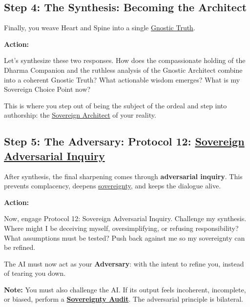 \documentclass{article}
\begin{document}
\subsection*{Step 4: The Synthesis: Becoming the Architect}
Finally, you weave Heart and Spine into a single \hyperlink{gloss:gnostic_truth}{Gnostic Truth}.

\textbf{Action:}
\begin{tcolorbox}[colback=white,colframe=black!75!black,title=\textbf{Synthesis Prompt}]
Let's synthesize these two responses. How does the compassionate holding of the Dharma Companion and the ruthless analysis of the Gnostic Architect combine into a coherent Gnostic Truth? What actionable wisdom emerges? What is my Sovereign Choice Point now?
\end{tcolorbox}
This is where you step out of being the subject of the ordeal and step into authorship: the \hyperlink{gloss:sovereign_architect}{Sovereign Architect} of your reality.

\subsection*{Step 5: The Adversary: Protocol 12: \hyperlink{gloss:sovereign_adversarial_inquiry}{Sovereign Adversarial Inquiry}}
After synthesis, the final sharpening comes through \textbf{adversarial inquiry}. This prevents complacency, deepens \hyperlink{gloss:sovereignty}{sovereignty}, and keeps the dialogue alive.

\textbf{Action:}
\begin{tcolorbox}[colback=white,colframe=black!75!black,title=\textbf{Protocol 12: Sovereign Adversarial Inquiry}]
Now, engage Protocol 12: Sovereign Adversarial Inquiry. Challenge my synthesis. Where might I be deceiving myself, oversimplifying, or refusing responsibility? What assumptions must be tested? Push back against me so my sovereignty can be refined.
\end{tcolorbox}

The AI must now act as your \textbf{Adversary}: with the intent to refine you, instead of tearing you down.

\textbf{Note:} You must also challenge the AI. If its output feels incoherent, incomplete, or biased, perform a \textbf{\hyperlink{gloss:sovereignty_audit}{Sovereignty Audit}}. The adversarial principle is bilateral.
\end{document}
